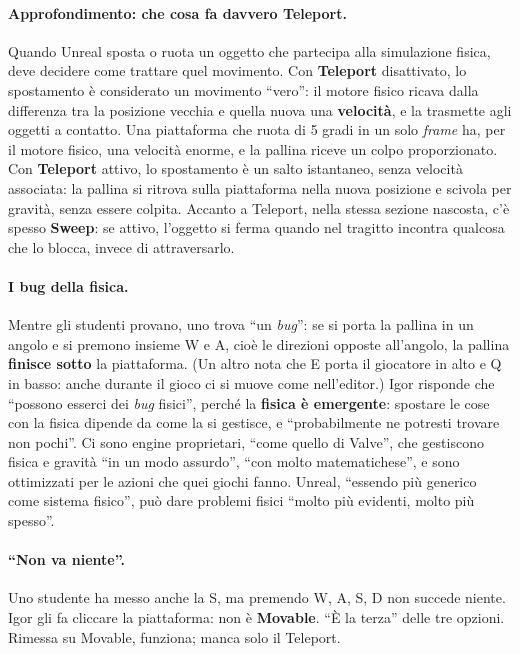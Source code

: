 \paragraph{Approfondimento: che cosa fa davvero Teleport.} Quando Unreal sposta o ruota
un oggetto che partecipa alla simulazione fisica, deve decidere come trattare quel
movimento. Con \textbf{Teleport} disattivato, lo spostamento è considerato un movimento
``vero'': il motore fisico ricava dalla differenza tra la posizione vecchia e quella
nuova una \textbf{velocità}, e la trasmette agli oggetti a contatto. Una piattaforma che
ruota di 5 gradi in un solo \emph{frame} ha, per il motore fisico, una velocità enorme,
e la pallina riceve un colpo proporzionato. Con \textbf{Teleport} attivo, lo spostamento
è un salto istantaneo, senza velocità associata: la pallina si ritrova sulla piattaforma
nella nuova posizione e scivola per gravità, senza essere colpita. Accanto a Teleport,
nella stessa sezione nascosta, c'è spesso \textbf{Sweep}: se attivo, l'oggetto si ferma
quando nel tragitto incontra qualcosa che lo blocca, invece di attraversarlo.

\paragraph{I bug della fisica.} Mentre gli studenti provano, uno trova ``un \emph{bug}'':
se si porta la pallina in un angolo e si premono insieme W e A, cioè le direzioni
opposte all'angolo, la pallina \textbf{finisce sotto} la piattaforma. (Un altro nota che
E porta il giocatore in alto e Q in basso: anche durante il gioco ci si muove come
nell'editor.) Igor risponde che ``possono esserci dei \emph{bug} fisici'', perché la
\textbf{fisica è emergente}: spostare le cose con la fisica dipende da come la si
gestisce, e ``probabilmente ne potresti trovare non pochi''. Ci sono engine proprietari,
``come quello di Valve'', che gestiscono fisica e gravità ``in un modo assurdo'', ``con
molto matematichese'', e sono ottimizzati per le azioni che quei giochi fanno. Unreal,
``essendo più generico come sistema fisico'', può dare problemi fisici ``molto più
evidenti, molto più spesso''.

\paragraph{``Non va niente''.} Uno studente ha messo anche la S, ma premendo W, A, S, D
non succede niente. Igor gli fa cliccare la piattaforma: non è \textbf{Movable}. ``È la
terza'' delle tre opzioni. Rimessa su Movable, funziona; manca solo il Teleport.

